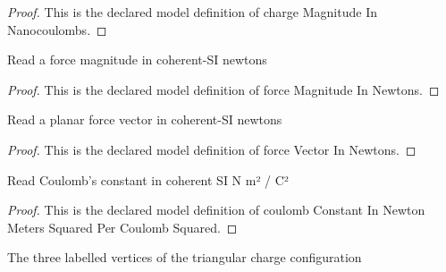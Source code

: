 \begin{proof}
  This is the declared model definition of charge Magnitude In Nanocoulombs.
\end{proof}
\begin{definition}
  \label{def:physics:phyx-mini-0893:phyxminiproblems-problemphyxmini0893-forcemagnitudeinnewtons}
  Read a force magnitude in coherent-SI newtons
\end{definition}
\begin{proof}
  This is the declared model definition of force Magnitude In Newtons.
\end{proof}
\begin{definition}
  \label{def:physics:phyx-mini-0893:phyxminiproblems-problemphyxmini0893-forcevectorinnewtons}
  Read a planar force vector in coherent-SI newtons
\end{definition}
\begin{proof}
  This is the declared model definition of force Vector In Newtons.
\end{proof}
\begin{definition}
  \label{def:physics:phyx-mini-0893:phyxminiproblems-problemphyxmini0893-coulombconstantinnewtonmeterssquaredpercoulombsquared}
  Read Coulomb's constant in coherent SI N m² / C²
\end{definition}
\begin{proof}
  This is the declared model definition of coulomb Constant In Newton Meters Squared Per Coulomb Squared.
\end{proof}
\begin{definition}
  \label{def:physics:phyx-mini-0893:phyxminiproblems-problemphyxmini0893-trianglevertex}
  The three labelled vertices of the triangular charge configuration
\end{definition}
